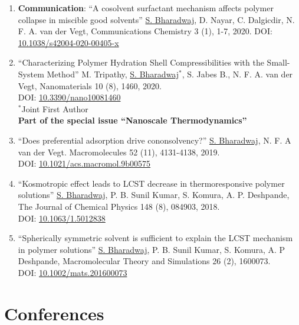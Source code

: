 \documentclass[a4paper,14pt]{article}
\begin{document}
\begin{enumerate}
\item
\textbf{Communication}: \enquote{A cosolvent surfactant mechanism affects polymer collapse in miscible good solvents}
\underline{S. Bharadwaj}, D. Nayar, C. Dalgicdir, N. F. A. van der Vegt,
Communications Chemistry 3 (1), 1-7, 2020.
DOI: \href{https://doi.org/10.1038/s42004-020-00405-x}{10.1038/s42004-020-00405-x}
\item
\enquote{Characterizing Polymer Hydration Shell Compressibilities with the Small-System Method}
M. Tripathy, \underline{S. Bharadwaj}$^{\ast}$, S. Jabes B., N. F. A. van der Vegt,
Nanomaterials 10 (8), 1460, 2020.\\
DOI: \href{https://doi.org/10.3390/nano10081460}{10.3390/nano10081460}\\
$^{\ast}$Joint First Author\\
\textbf{Part of the special issue \enquote{Nanoscale Thermodynamics}}
\item
\enquote{Does preferential adsorption drive cononsolvency?}
\underline{S. Bharadwaj}, N. F. A van der Vegt.
Macromolecules 52 (11), 4131-4138, 2019.\\
DOI: \href{https://doi.org/10.1021/acs.macromol.9b00575}{10.1021/acs.macromol.9b00575}
\item
\enquote{Kosmotropic effect leads to LCST decrease in thermoresponsive polymer solutions}
\underline{S. Bharadwaj}, P. B. Sunil Kumar, S. Komura, A. P. Deshpande,
The Journal of Chemical Physics 148 (8), 084903, 2018.\\
DOI: \href{https://doi.org/10.1063/1.5012838}{10.1063/1.5012838}
\item
\enquote{Spherically symmetric solvent is sufficient to explain the LCST mechanism in polymer solutions}
\underline{S. Bharadwaj}, P. B. Sunil Kumar, S. Komura, A. P Deshpande, Macromolecular Theory and Simulations 26 (2), 1600073.\\
DOI: \href{https://doi.org/10.1002/mats.201600073}{10.1002/mats.201600073}
\end{enumerate}
\section*{Conferences}
\end{document}
